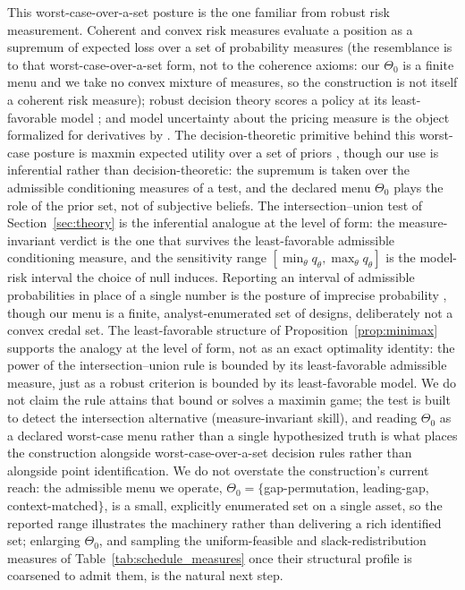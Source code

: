 \documentclass[preprint,12pt]{elsarticle}
\theoremstyle{definition}
\begin{document}
This worst-case-over-a-set posture is the one familiar from robust risk
measurement. Coherent and convex risk measures evaluate a position as a supremum of
expected loss over a set of probability measures \cite{ArtznerDelbaenEberHeath1999}
(the resemblance is to that worst-case-over-a-set form, not to the coherence axioms:
our $\Theta_0$ is a finite menu and we take no convex mixture of measures, so the
construction is not itself a coherent risk measure); robust decision theory scores a
policy at its least-favorable model \cite{HansenSargent2008}; and model uncertainty
about the pricing measure is the object formalized for derivatives by
\cite{Cont2006}. The decision-theoretic primitive behind this worst-case posture is maxmin expected utility over a set of priors \cite{GilboaSchmeidler1989}, though our use is inferential rather than decision-theoretic: the supremum is taken over the admissible conditioning measures of a test, and the declared menu $\Theta_0$ plays the role of the prior set, not of subjective beliefs. The intersection--union test of Section~\ref{sec:theory} is the
inferential analogue at the level of form: the measure-invariant verdict is the one
that survives the least-favorable admissible conditioning measure, and the
sensitivity range $[\min_\theta q_\theta,\max_\theta q_\theta]$ is the model-risk
interval the choice of null induces. Reporting an interval of admissible probabilities in place of a single number is the posture of imprecise probability \cite{Walley1991}, though our menu is a finite, analyst-enumerated set of designs, deliberately not a convex credal set. The least-favorable structure of
Proposition~\ref{prop:minimax} supports the analogy at the level of form, not as an
exact optimality identity: the power of the intersection--union rule is bounded by
its least-favorable admissible measure, just as a robust criterion is bounded by its
least-favorable model. We do not claim the rule attains that bound or solves a
maximin game; the test is built to detect the intersection alternative
(measure-invariant skill), and reading $\Theta_0$ as a declared worst-case menu
rather than a single hypothesized truth is what places the construction alongside
worst-case-over-a-set decision rules rather than alongside point identification. We do not overstate the construction's current reach: the
admissible menu we operate, $\Theta_0=\{$gap-permutation, leading-gap,
context-matched$\}$, is a small, explicitly enumerated set on a single asset, so the
reported range illustrates the machinery rather than delivering a rich identified set;
enlarging $\Theta_0$, and sampling the uniform-feasible and slack-redistribution
measures of Table~\ref{tab:schedule_measures} once their structural profile is
coarsened to admit them, is the natural next step.
\end{document}
